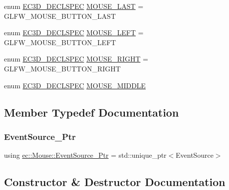 \begin{DoxyCompactItemize}
\item 
enum \mbox{\hyperlink{_common_8h_aac42573e202ca3dd4d259c81691e2369}{E\+C3\+D\+\_\+\+D\+E\+C\+L\+S\+P\+EC}} \mbox{\hyperlink{classec_1_1_mouse_ad36d2595387f7a090615c4ee6012f2ef}{M\+O\+U\+S\+E\+\_\+\+L\+A\+ST}} = G\+L\+F\+W\+\_\+\+M\+O\+U\+S\+E\+\_\+\+B\+U\+T\+T\+O\+N\+\_\+\+L\+A\+ST
\item 
enum \mbox{\hyperlink{_common_8h_aac42573e202ca3dd4d259c81691e2369}{E\+C3\+D\+\_\+\+D\+E\+C\+L\+S\+P\+EC}} \mbox{\hyperlink{classec_1_1_mouse_a475b1f4a649a42df221e6bc70c65ad95}{M\+O\+U\+S\+E\+\_\+\+L\+E\+FT}} = G\+L\+F\+W\+\_\+\+M\+O\+U\+S\+E\+\_\+\+B\+U\+T\+T\+O\+N\+\_\+\+L\+E\+FT
\item 
enum \mbox{\hyperlink{_common_8h_aac42573e202ca3dd4d259c81691e2369}{E\+C3\+D\+\_\+\+D\+E\+C\+L\+S\+P\+EC}} \mbox{\hyperlink{classec_1_1_mouse_a433aac3a68d060b7f330976e5855ddad}{M\+O\+U\+S\+E\+\_\+\+R\+I\+G\+HT}} = G\+L\+F\+W\+\_\+\+M\+O\+U\+S\+E\+\_\+\+B\+U\+T\+T\+O\+N\+\_\+\+R\+I\+G\+HT
\item 
enum \mbox{\hyperlink{_common_8h_aac42573e202ca3dd4d259c81691e2369}{E\+C3\+D\+\_\+\+D\+E\+C\+L\+S\+P\+EC}} \mbox{\hyperlink{classec_1_1_mouse_a0fbdf11d1d258a805821e37141f95131}{M\+O\+U\+S\+E\+\_\+\+M\+I\+D\+D\+LE}}
\end{DoxyCompactItemize}


\subsection{Member Typedef Documentation}
\mbox{\label{classec_1_1_mouse_a6aa210c1821f23f8685a544a587ae11a}} 
\subsubsection{\texorpdfstring{Event\+Source\+\_\+\+Ptr}{EventSource\_Ptr}}
{\footnotesize\ttfamily using \mbox{\hyperlink{classec_1_1_mouse_a6aa210c1821f23f8685a544a587ae11a}{ec\+::\+Mouse\+::\+Event\+Source\+\_\+\+Ptr}} =  std\+::unique\+\_\+ptr$<$Event\+Source$>$}



\subsection{Constructor \& Destructor Documentation}
\mbox{\label{classec_1_1_mouse_ac1154831feadd646ecabad6dc1d42136}} 
